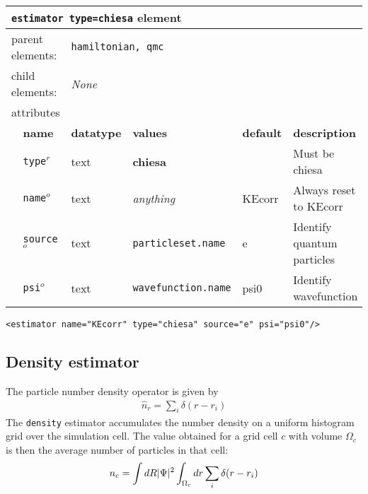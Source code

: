 \FloatBarrier
\begin{table}[h]
\begin{center}
\begin{tabularx}{\textwidth}{l l l l l l }
\hline
\multicolumn{6}{l}{\texttt{estimator type=chiesa} element} \\
\hline
\multicolumn{2}{l}{parent elements:} & \multicolumn{4}{l}{\texttt{hamiltonian, qmc}}\\
\multicolumn{2}{l}{child  elements:} & \multicolumn{4}{l}{\textit{None}}\\
\multicolumn{2}{l}{attributes}  & \multicolumn{4}{l}{}\\
   &   \bfseries name     & \bfseries datatype & \bfseries values & \bfseries default   & \bfseries description \\
   & \texttt{type}$^r$    &  text              & \textbf{chiesa}            &        & Must be chiesa         \\
   & \texttt{name}$^o$    &  text              & \textit{anything}          & KEcorr & Always reset to KEcorr \\
   & \texttt{source}$^o$  &  text              & \texttt{particleset.name}  & e      & Identify quantum particles\\
   & \texttt{psi}$^o$     &  text              & \texttt{wavefunction.name} & psi0   & Identify wavefunction  \\
  \hline
\end{tabularx}
\end{center}
\end{table}
\FloatBarrier

\begin{lstlisting}[caption=``Chiesa'' kinetic energy finite size post-correction.]
   <estimator name="KEcorr" type="chiesa" source="e" psi="psi0"/>
\end{lstlisting}




\subsection{Density estimator}
The particle number density operator is given by
\begin{align}
  \hat{n}_r = \sum_i\delta(r-r_i)
\end{align}
The \texttt{density} estimator accumulates the number density on a uniform histogram grid over the simulation cell.  The value obtained for a grid cell $c$ with volume $\Omega_c$ is then the average number of particles in that cell:
\begin{align}
  n_c = \int dR \lvert \Psi \rvert^2 \int_{\Omega_c}dr \sum_i\delta(r-r_i)
\end{align}  


